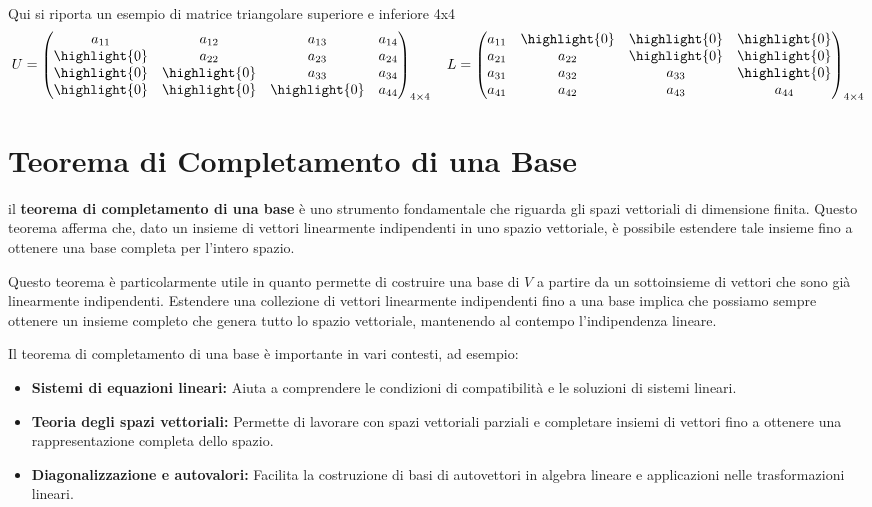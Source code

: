 \leavevmode\\
Qui si riporta un esempio di matrice triangolare superiore e inferiore 4x4
$$
U =
\begin{pmatrix}
  a_{11} & a_{12} & a_{13} & a_{14} \\
  \highlight{0} & a_{22} & a_{23} & a_{24} \\
  \highlight{0} & \highlight{0} & a_{33} & a_{34} \\
  \highlight{0} & \highlight{0} & \highlight{0} & a_{44}
\end{pmatrix}_{4 \times 4}
\quad
L =
\begin{pmatrix}
  a_{11} & \highlight{0} & \highlight{0} & \highlight{0} \\
  a_{21} & a_{22} & \highlight{0} & \highlight{0} \\
  a_{31} & a_{32} & a_{33} & \highlight{0} \\
  a_{41} & a_{42} & a_{43} & a_{44}
\end{pmatrix}_{4 \times 4}
$$

\section{Teorema di Completamento di una Base}

il \textbf{teorema di completamento di una base} è uno strumento
fondamentale che riguarda gli spazi vettoriali di dimensione finita.
Questo teorema afferma che, dato un insieme di vettori linearmente
indipendenti in uno spazio vettoriale, è possibile estendere tale
insieme fino a ottenere una base completa per l'intero spazio.

Questo teorema è particolarmente utile in quanto permette di
costruire una base di \( V \) a partire da un sottoinsieme di vettori
che sono già linearmente indipendenti. Estendere una collezione di
vettori linearmente indipendenti fino a una base implica che possiamo
sempre ottenere un insieme completo che genera tutto lo spazio
vettoriale, mantenendo al contempo l'indipendenza lineare.

Il teorema di completamento di una base è importante in vari
contesti, ad esempio:
\begin{itemize}
  \item \textbf{Sistemi di equazioni lineari:} Aiuta a comprendere le
    condizioni di compatibilità e le soluzioni di sistemi lineari.
  \item \textbf{Teoria degli spazi vettoriali:} Permette di lavorare
    con spazi vettoriali parziali e completare insiemi di vettori
    fino a ottenere una rappresentazione completa dello spazio.
  \item \textbf{Diagonalizzazione e autovalori:} Facilita la
    costruzione di basi di autovettori in algebra lineare e
    applicazioni nelle trasformazioni lineari.
\end{itemize}

